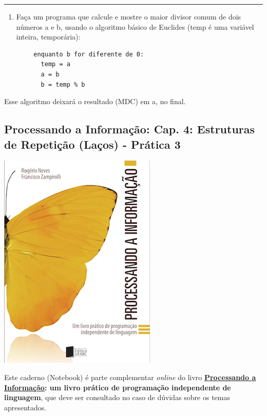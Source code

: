 \documentclass[12pt,a4paper]{article}
\providecommand{\tightlist}{%
      \setlength{\itemsep}{0pt}\setlength{\parskip}{0pt}}
\begin{document}
    \begin{center}\rule{0.5\linewidth}{0.5pt}\end{center}

\begin{enumerate}
\def\labelenumi{\arabic{enumi}.}
\setcounter{enumi}{12}
\tightlist
\item
  Faça um programa que calcule e mostre o maior divisor comum de dois
  números a e b, usando o algoritmo básico de Euclides (temp é uma
  variável inteira, temporária):
\end{enumerate}

\begin{verbatim}
        enquanto b for diferente de 0:
          temp = a
          a = b
          b = temp % b
\end{verbatim}

Esse algoritmo deixará o resultado (MDC) em a, no final.

    \hypertarget{processando-a-informauxe7uxe3o-cap.-4-estruturas-de-repetiuxe7uxe3o-lauxe7os---pruxe1tica-3}{%
\subsection{Processando a Informação: Cap. 4: Estruturas de Repetição
(Laços) - Prática
3}\label{processando-a-informauxe7uxe3o-cap.-4-estruturas-de-repetiuxe7uxe3o-lauxe7os---pruxe1tica-3}}

    \includegraphics{"figs/Capa_Processando_Informacao.jpg"}

Este caderno (Notebook) é parte complementar \emph{online} do livro
\textbf{\href{https://editora.ufabc.edu.br/matematica-e-ciencias-da-computacao/58-processando-a-informacao}{Processando
a Informação}: um livro prático de programação independente de
linguagem}, que deve ser consultado no caso de dúvidas sobre os temas
apresentados.
\end{document}
